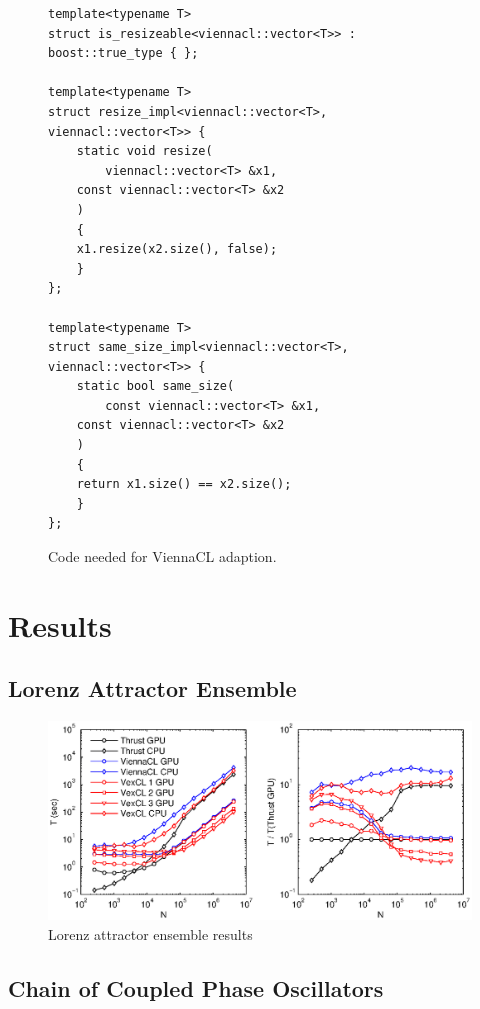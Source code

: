 \documentclass[1p]{elsarticle}
\begin{document}
\begin{figure}
\begin{lstlisting}
template<typename T>
struct is_resizeable<viennacl::vector<T>> : boost::true_type { };

template<typename T>
struct resize_impl<viennacl::vector<T>, viennacl::vector<T>> {
    static void resize(
        viennacl::vector<T> &x1,
	const viennacl::vector<T> &x2
	)
    {
	x1.resize(x2.size(), false);
    }
};

template<typename T>
struct same_size_impl<viennacl::vector<T>, viennacl::vector<T>> {
    static bool same_size(
        const viennacl::vector<T> &x1,
	const viennacl::vector<T> &x2
	)
    {
	return x1.size() == x2.size();
    }
};
\end{lstlisting}
\caption{Code needed for ViennaCL adaption.}
\label{fig:adapt:viennacl}
\end{figure}


\section{Results}

\subsection{Lorenz Attractor Ensemble}

\begin{figure}
    \begin{center}
	\includegraphics[width=\textwidth]{data/lorenz_ensemble/lorenz_ensemble}
    \end{center}
    \caption{Lorenz attractor ensemble results}
    \label{fig:lorenz:perf}
\end{figure}

\subsection{Chain of Coupled Phase Oscillators}
\end{document}
